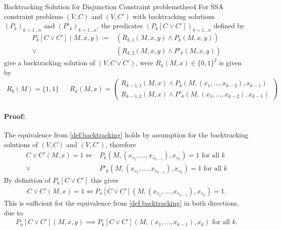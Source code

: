 \begin{theorem}{Backtracking Solution for Disjunction Constraint problems}{theo4}
    For SSA constraint problems $(V,C)$ and $(V,C')$ with backtracking
    solutions $(P_k)_{k=1\dots n}$ and $(P'_k)_{k=1\dots n}$, the
    predicates $(P_k[C\mathrel\lor C'])_{k=1\dots n}$ defined by
    \begin{align*}
        P_k[C\mathrel\lor C'](M,x,y):={}&\left(R_{k,1}(M,x,y)\mathrel\land P_k(M,x,y)\right)\\
                          \mathrel\lor{}&\left(R_{k,2}(M,x,y)\mathrel\land P'_k(M,x,y)\right)
    \end{align*}
    give a backtracking solution of $(V,C\mathrel\lor C')$, were $R_k(M,x)\in\{0,1\}^2$
    is given by 
    \begin{align*}
        R_0(M)=\{1,1\}&&
        R_k(M,x)=\left(
            \begin{array}{l}
                R_{k-1,1}(M,x)\mathrel\land P_k(M,(x_1,\dots,x_{k-2}),x_{k-1})\\
                R_{k-1,2}(M,x)\mathrel\land P'_k(M,(x_1,\dots,x_{k-2}),x_{k-1})
            \end{array}\right)
    \end{align*}
    \tcblower
    \paragraph*{Proof:} The equivalence from \autoref{def:backtracking}
                        holds by assumption for the backtracking solutions
                        of $(V,C)$ and $(V,C')$, therefore
    \begin{align*}
        C\mathrel\lor C'(M,x)=1\iff{}& P_k(M,(x_{v_1},\dots,x_{v_{k-1}}),x_{v_k})=1\text{ for all }k\\
                              \mathrel\lor{}& P'_k(M,(x_{v_1},\dots,x_{v_{k-1}}),x_{v_k})=1\text{ for all }k
    \end{align*}
    By definition of $P_k[C\mathrel\lor C']$ this gives
    \begin{align*}
        C\mathrel\lor C'(M,x)=1\iff{}P_n[C\mathrel\lor C'](M,(x_{v_1},\dots,x_{v_{n-1}}),x_{v_n})=1.
    \end{align*}
    This is sufficient for the equivalence from \autoref{def:backtracking}
    in both directions, due to
    \begin{align*}
        P_n[C\mathrel\lor C'](M,x,y)\implies P_k[C\mathrel\lor C'](M,(x_1,\dots,x_{k-1}),x_k)\text{ for all }k.
    \end{align*}
\end{theorem}
